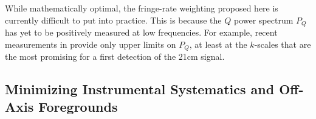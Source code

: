 \documentclass[twocolumn,apj,numberedappendix]{emulateapj}
\begin{document}
While mathematically optimal, the fringe-rate weighting proposed here is currently difficult
to put into practice. This is because the $Q$ power spectrum $P_Q$ has yet to be positively
measured at low frequencies. For example, recent measurements in \citet{moore_et_al2015}
provide only upper limits on $P_Q$, at least at the $k$-scales that are the
most promising for a first detection of the 21cm signal.
%
%


\subsection{Minimizing Instrumental Systematics and Off-Axis Foregrounds}
\label{sec:foregrounds}
\end{document}
